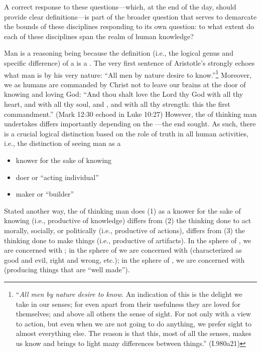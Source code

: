 A correct response to these questions---which, at the end of the day, should provide clear definitions---is part of the broader question that serves to demarcate the bounds of these disciplines responding to its own question: to what extent do each of these disciplines span the realm of human knowledge?

Man is a reasoning being because the definition (i.e., the logical genus and specific difference) of a  is a . The very first sentence of Aristotle's  strongly echoes what man is by his very nature: ``All men by nature desire to know.''\footnote{``\emph{All men by nature desire to know}. An indication of this is the delight we take in our senses; for even apart from their usefulness they are loved for themselves; and above all others the sense of sight. For not only with a view to action, but even when we are not going to do anything, we prefer sight to almost everything else. The reason is that this, most of all the senses, makes us know and brings to light many differences between things.'' (I.980a21)} Moreover, we as humans are commanded by Christ not to leave our brains at the door of knowing and loving God: ``And thou shalt love the Lord thy God with all thy heart, and with all thy soul, and , and with all thy strength: this  the first commandment.'' (Mark 12:30 echoed in Luke 10:27) However, the  of thinking man undertakes differs importantly depending on the ---the end sought. As such, there is a crucial logical distinction based on the role of truth in all human activities, i.e., the distinction of seeing man as a

\begin{itemize}
\item knower for the sake of knowing
\item doer or ``acting individual''
\item maker or ``builder''
\end{itemize}

Stated another way, the  of thinking man does (1) as a knower for the sake of knowing (i.e., productive of knowledge) differs from (2) the thinking done to act morally, socially, or politically (i.e., productive of actions), differs from (3) the thinking done to make things (i.e., productive of artifacts). In the sphere of , we are concerned with ; in the sphere of  we are concerned with  (characterized as good and evil, right and wrong, etc.); in the sphere of , we are concerned with  (producing things that are ``well made'').

